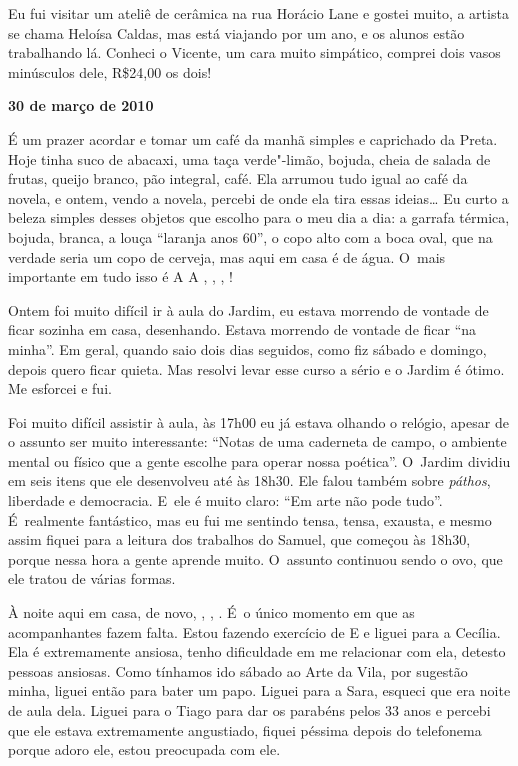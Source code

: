 Eu fui visitar um ateliê de cerâmica na rua Horácio Lane e gostei muito,
a artista se chama Heloísa Caldas, mas está viajando por um ano, e os
alunos estão trabalhando lá. Conheci o Vicente, um cara muito simpático,
comprei dois vasos minúsculos dele, R\$24,00 os dois!

\begin{flushright}\textbf{30 de março de 2010}\end{flushright}


É um prazer acordar e tomar um café da manhã simples e caprichado da
Preta. Hoje tinha suco de abacaxi, uma taça verde"-limão, bojuda, cheia
de salada de frutas, queijo branco, pão integral, café. Ela arrumou tudo
igual ao café da novela, e ontem, vendo a novela, percebi de onde ela
tira essas ideias… Eu curto a beleza simples desses objetos que
escolho para o meu dia a dia: a garrafa térmica, bojuda, branca, a louça
``laranja anos 60'', o copo alto com a boca oval, que na verdade seria
um copo de cerveja, mas aqui em casa é de água. O~mais importante em
tudo isso é   A      
   A , , , !

Ontem foi muito difícil ir à aula do Jardim, eu estava morrendo de
vontade de ficar sozinha em casa, desenhando. Estava morrendo de vontade
de ficar ``na minha''. Em geral, quando saio dois dias seguidos, como
fiz sábado e domingo, depois quero ficar quieta. Mas resolvi levar esse
curso a sério e o Jardim é ótimo. Me esforcei e fui.

Foi muito difícil assistir à aula, às 17h00 eu já estava olhando o
relógio, apesar de o assunto ser muito interessante: ``Notas de uma
caderneta de campo, o ambiente mental ou físico que a gente escolhe para
operar nossa poética''. O~Jardim dividiu em seis itens que ele
desenvolveu até às 18h30. Ele falou também sobre \emph{páthos},
liberdade e democracia. E~ele é muito claro: ``Em arte não pode tudo''.
É~realmente fantástico, mas eu fui me sentindo tensa, tensa, exausta,
e mesmo assim fiquei para a leitura dos trabalhos do Samuel, que começou
às 18h30, porque nessa hora a gente aprende muito. O~assunto continuou
sendo o ovo, que ele tratou de várias formas.

À noite aqui em casa, de novo, , , . É~o único
momento em que as acompanhantes fazem falta. Estou fazendo exercício de
 E  e liguei para a Cecília. Ela é extremamente
ansiosa, tenho dificuldade em me relacionar com ela, detesto pessoas
ansiosas. Como tínhamos ido sábado ao Arte da Vila, por sugestão minha,
liguei então para bater um papo. Liguei para a Sara, esqueci que era
noite de aula dela. Liguei para o Tiago para dar os parabéns pelos 33
anos e percebi que ele estava extremamente angustiado, fiquei péssima
depois do telefonema porque adoro ele, estou preocupada com ele.

